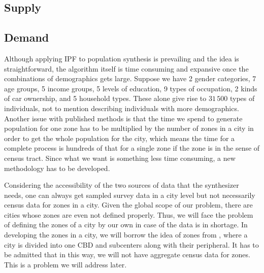 \documentclass[11pt,twoside]{article}
\numberwithin{equation}{section}
\newcommand{\?}{\stackrel{?}{=}}
\begin{document}
\subsection{Supply}

\subsection{Demand}


Although applying IPF to population synthesis is prevailing and the idea is straightforward, the algorithm itself is time consuming and expansive once the combinations of demographics gets large.
Suppose we have 2 gender categories, 7 age groups, 5 income groups, 5 levels of education, 9 types of occupation, 2 kinds of car ownership, and 5 household types.
These alone give rise to $31\,500$ types of individuals, not to mention describing individuals with more demographics.
Another issue with published methods is that the time we spend to generate population for one zone has to be multiplied by the number of zones in a city in order to get the whole population for the city, which means the time for a complete process is hundreds of that for a single zone if the zone is in the sense of census tract.
Since what we want is something less time consuming, a new methodology has to be developed.

Considering the accessibility of the two sources of data that the synthesizer needs, one can always get sampled survey data in a city level but not necessarily census data for zones in a city.
Given the global scope of our problem, there are cities whose zones are even not defined properly.
Thus, we will face the problem of defining the zones of a city by our own in case of the data is in shortage.
In developing the zones in a city, we will borrow the idea of zones from \textcite{fielbaum2016parametric}, where a city is divided into one CBD and subcenters along with their peripheral.
It has to be admitted that in this way, we will not have aggregate census data for zones. This is a problem we will address later. 
\end{document}
